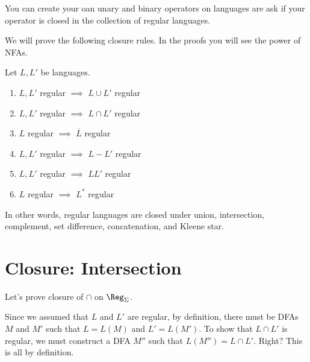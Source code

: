 You can create your oan unary and binary operators on languages are ask
if your operator is closed in the collection of regular languages.

 
We will prove the following closure rules. In the proofs you will
see the power of NFAs.



\begin{thm}
 Let $L,L'$ be languages.
 \begin{enumerate}[label=\textnormal{(\alph*)},itemsep=0pt,nosep,noitemsep,partopsep=0pt,topsep=0pt,parsep=0pt]
  \item $L,L'$ regular $\implies$ $L \cup L'$ regular
  \item $L,L'$ regular $\implies$ $L \cap L'$ regular
  \item $L$ regular $\implies$ $\overline{L}$ regular
  \item $L,L'$ regular $\implies$ $L - L'$ regular
  \item $L,L'$ regular $\implies$ $LL'$ regular
  \item $L$ regular $\implies$ $L^*$ regular
 \end{enumerate}
 In other words, regular languages
 are closed under union, intersection, complement, set difference,
 concatenation, and Kleene star.
 \end{thm}





\newpage
\section{Closure: Intersection}

Let's prove closure of $\cap$ on $\Reg_\Sigma$.

Since we assumed that $L$ and $L'$ are regular, by definition,
there must be DFAs $M$ and $M'$ such that $L = L(M)$ and $L' =
L(M')$. To show that $L \cap L'$ is regular, we must construct a
DFA $M''$ such that $L(M'') = L\cap L'$. Right? This is all by
definition.

